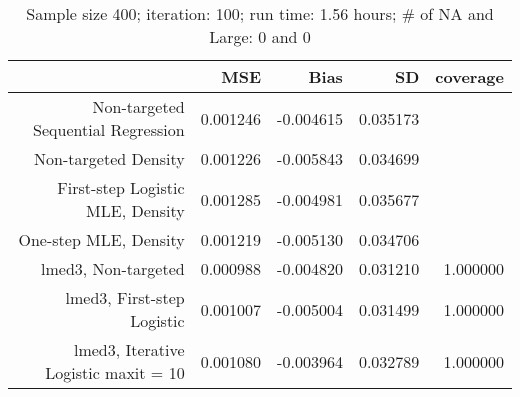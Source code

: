 \begin{table}[ht]
\centering
\caption{Sample size 400; iteration: 100; run time: 1.56 hours; # of NA and Large:  0 and 0} 
\begin{tabular}{rrrrr}
  \hline
 & MSE & Bias & SD & coverage \\ 
  \hline
Non-targeted Sequential Regression & 0.001246 & -0.004615 & 0.035173 &  \\ 
  Non-targeted Density & 0.001226 & -0.005843 & 0.034699 &  \\ 
  First-step Logistic MLE, Density & 0.001285 & -0.004981 & 0.035677 &  \\ 
  One-step MLE, Density & 0.001219 & -0.005130 & 0.034706 &  \\ 
  lmed3, Non-targeted & 0.000988 & -0.004820 & 0.031210 & 1.000000 \\ 
  lmed3, First-step Logistic & 0.001007 & -0.005004 & 0.031499 & 1.000000 \\ 
  lmed3, Iterative Logistic maxit = 10 & 0.001080 & -0.003964 & 0.032789 & 1.000000 \\ 
   \hline
\end{tabular}
\end{table}
